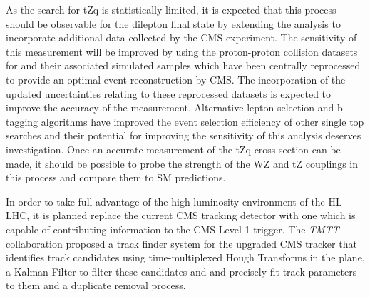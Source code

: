 
As the search for tZq is statistically limited, it is expected that this process should be observable for the dilepton final state by extending the analysis to incorporate additional data collected by the CMS experiment.
The sensitivity of this measurement will be improved by using the proton-proton collision datasets for and their associated simulated samples which have been centrally reprocessed to provide an optimal event reconstruction by CMS.
The incorporation of the updated uncertainties relating to these reprocessed datasets is  expected to improve the accuracy of the measurement.
Alternative lepton selection and b-tagging algorithms have improved the event selection efficiency of other single top searches and their potential for improving the sensitivity of this analysis deserves investigation.
Once an accurate measurement of the tZq cross section can be made, it should be possible to probe  the strength of the WZ and tZ couplings in this process and compare them to SM predictions.

%

In order to take full advantage of the high luminosity environment of the HL-LHC, it is planned replace the current CMS tracking detector with one which is capable of contributing information to the CMS Level-1 trigger.
The \emph{TMTT} collaboration proposed a track finder system for the upgraded CMS tracker that identifies track candidates using time-multiplexed Hough Transforms in the \rphi plane, a Kalman Filter to filter these candidates and and precisely fit track parameters to them and a duplicate removal process.

